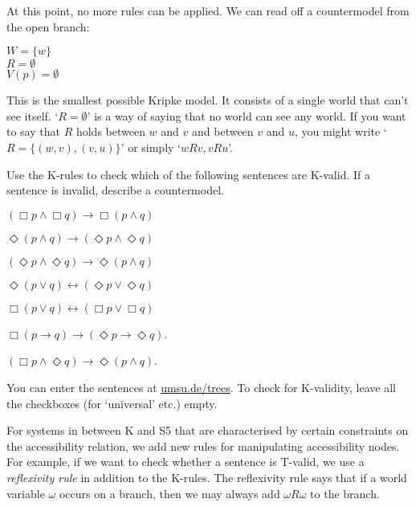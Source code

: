 \begin{center}
\end{center}
%
At this point, no more rules can be applied. We can read off a countermodel from
the open branch:
\begin{center}
  $W = \{ w \}$\\
  $R = \emptyset$\\
  $V(p) = \emptyset$
\end{center}
This is the smallest possible Kripke model. It consists of a single world that
can't see itself. `$R = \emptyset$' is a way of saying that no world can see any
world. If you want to say that $R$ holds between $w$ and $v$ and between $v$ and
$u$, you might write `$R = \{ (w,v), (v,u) \}$' or simply `$wRv, vRu$'.

\begin{exercise}
  Use the K-rules to check which of the following sentences are K-valid. If a sentence is invalid, describe a countermodel.
  \begin{exlist}
  \item $(\Box p \land \Box q) \to \Box (p \land q)$
  \item $\Diamond (p \land q) \to (\Diamond p \land \Diamond q)$
  \item $(\Diamond p \land \Diamond q) \to \Diamond (p \land q)$
  \item $\Diamond(p \lor q) \leftrightarrow (\Diamond p \lor \Diamond q)$
  \item $\Box(p \lor q) \leftrightarrow (\Box p \lor \Box q)$
  \item $\Box (p \to q) \to (\Diamond p \to \Diamond q)$. %
  \item $(\Box p \land \Diamond q) \to \Diamond (p \land q)$. %
  \end{exlist}
\end{exercise}
\begin{solution}
  You can enter the sentences at
  \href{https://www.umsu.de/trees/}{umsu.de/trees}. To check for K-validity, leave all the checkboxes (for `universal' etc.) empty.
\end{solution}

For systems in between K and S5 that are characterised by certain constraints on
the accessibility relation, we add new rules for manipulating accessibility
nodes. For example, if we want to check whether a sentence is T-valid, we use a
\emph{reflexivity rule} in addition to the K-rules. The reflexivity rule says
that if a world variable $\omega$ occurs on a branch, then we may always add
$\omega R\omega$ to the branch.


